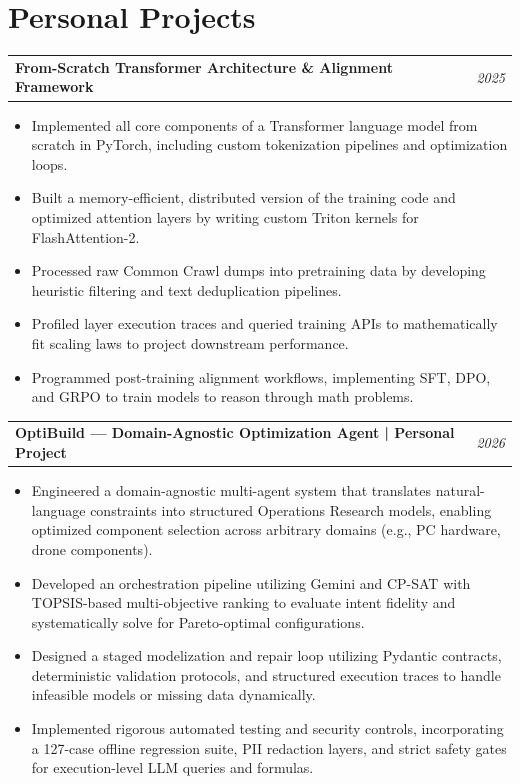 \documentclass[10pt,letterpaper]{article}
\makeatletter
\newcommand{\heading}[2]{\vspace{2pt}\begin{tabularx}{\textwidth}{@{}Xr@{}}\textbf{#1} & \textit{#2}\end{tabularx}\vspace{-0pt}}
\makeatother
\begin{document}
\section*{Personal Projects}
\heading{From-Scratch Transformer Architecture \& Alignment Framework}{2025}
\begin{itemize}
\item Implemented all core components of a Transformer language model from scratch in PyTorch, including custom tokenization pipelines and optimization loops.
\item Built a memory-efficient, distributed version of the training code and optimized attention layers by writing custom Triton kernels for FlashAttention-2.
\item Processed raw Common Crawl dumps into pretraining data by developing heuristic filtering and text deduplication pipelines.
\item Profiled layer execution traces and queried training APIs to mathematically fit scaling laws to project downstream performance.
\item Programmed post-training alignment workflows, implementing SFT, DPO, and GRPO to train models to reason through math problems.
\end{itemize}

\heading{OptiBuild --- Domain-Agnostic Optimization Agent | Personal Project}{2026}
\begin{itemize}
\item Engineered a domain-agnostic multi-agent system that translates natural-language constraints into structured Operations Research models, enabling optimized component selection across arbitrary domains (e.g., PC hardware, drone components).
\item Developed an orchestration pipeline utilizing Gemini and CP-SAT with TOPSIS-based multi-objective ranking to evaluate intent fidelity and systematically solve for Pareto-optimal configurations.
\item Designed a staged modelization and repair loop utilizing Pydantic contracts, deterministic validation protocols, and structured execution traces to handle infeasible models or missing data dynamically.
\item Implemented rigorous automated testing and security controls, incorporating a 127-case offline regression suite, PII redaction layers, and strict safety gates for execution-level LLM queries and formulas.
\end{itemize}
\end{document}
